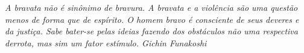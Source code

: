 

\begin{epigrafe}
    \vspace*{\fill}
	\begin{flushright}
		\textit{A bravata não é sinônimo de bravura. A bravata e a violência são uma questão menos de forma que de espírito. O homem bravo é consciente de seus deveres e da justiça. Sabe bater-se pelas ideias fazendo dos obstáculos não uma respectiva derrota, mas sim um fator estímulo. Gichin Funakoshi}
	\end{flushright}
\end{epigrafe}